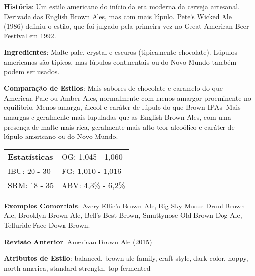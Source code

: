 \textbf{História}: Um estilo americano do início da era moderna da cerveja artesanal. Derivada das English Brown Ales, mas com mais lúpulo. Pete's Wicked Ale (1986) definiu o estilo, que foi julgado pela primeira vez no Great American Beer Festival em 1992.

\textbf{Ingredientes}: Malte pale, crystal e escuros (tipicamente chocolate). Lúpulos americanos são típicos, mas lúpulos continentais ou do Novo Mundo também podem ser usados.

\textbf{Comparação de Estilos}: Mais sabores de chocolate e caramelo do que American Pale ou Amber Ales, normalmente com menos amargor proeminente no equilíbrio. Menos amarga, álcool e caráter de lúpulo do que Brown IPAs. Mais amargas e geralmente mais lupuladas que as English Brown Ales, com uma presença de malte mais rica, geralmente mais alto teor alcoólico e caráter de lúpulo americano ou do Novo Mundo.

\begin{tabular}{@{}p{35mm}p{35mm}@{}}
  \textbf{Estatísticas} & OG: 1,045 - 1,060 \\
  IBU: 20 - 30  & FG: 1,010 - 1,016 \\
  SRM: 18 - 35  & ABV: 4,3\% - 6,2\%
\end{tabular}

\textbf{Exemplos Comerciais}: Avery Ellie’s Brown Ale, Big Sky Moose Drool Brown Ale, Brooklyn Brown Ale, Bell’s Best Brown, Smuttynose Old Brown Dog Ale, Telluride Face Down Brown.

\textbf{Revisão Anterior}: American Brown Ale (2015)

\textbf{Atributos de Estilo}: balanced, brown-ale-family, craft-style, dark-color, hoppy, north-america, standard-strength, top-fermented
